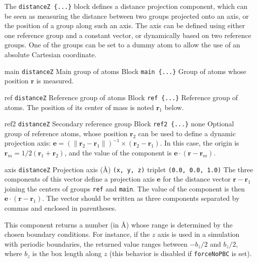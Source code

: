 The \texttt{distanceZ~\{...\}} block defines a distance projection
component, which can be seen as measuring the distance between two
groups projected onto an axis, or the position of a group along such
an axis.  The axis can be defined using either one reference group and
a constant vector, or dynamically based on two reference groups.
One of the groups can be set to a dummy atom to allow the use of an absolute Cartesian coordinate.

\begin{cvcoptions}
\item %
  \key
    {main}{%
    \texttt{distanceZ}}{%
    Main group of atoms}{%
    Block \texttt{main \{...\}}}{%
    Group of atoms whose position $\bm{r}$ is measured.}

\item %
  \key
    {ref}{%
    \texttt{distanceZ}}{%
    Reference group of
    atoms}{%
    Block \texttt{ref \{...\}}}{%
    Reference group of atoms.  The position of its center of mass is
    noted $\bm{r}_1$ below.}

\item %
  \keydef
    {ref2}{%
    \texttt{distanceZ}}{%
    Secondary reference
    group}{%
    Block \texttt{ref2 \{...\}}}{%
    none}{%
    Optional group of reference atoms, whose position $\bm{r}_2$ can
    be used to define a dynamic projection axis: $\bm{e}=(\| \bm{r}_2
    - \bm{r}_1\|)^{-1} \times (\bm{r}_2 - \bm{r}_1)$.  In this case,
    the origin is $\bm{r}_m = 1/2 (\bm{r}_1+\bm{r}_2)$, and the value
    of the component is $\bm{e} \cdot (\bm{r}-\bm{r}_m)$.}

\item %
  \keydef
    {axis}{%
    \texttt{distanceZ}}{%
    Projection axis (\AA{})}{%
    \texttt{(x, y, z)} triplet}{%
    \texttt{(0.0, 0.0, 1.0)}}{%
    The three components of this vector define a
    projection axis $\bm{e}$ for the distance vector $\bm{r} -
    \bm{r}_1$ joining the centers of groups \texttt{ref} and
    \texttt{main}. The value of the component is then $\bm{e} \cdot
    (\bm{r}-\bm{r}_1)$.  The vector should be written as three
    components separated by commas and enclosed in parentheses.}

\item %

\item %
\end{cvcoptions}
This component returns a number (in \AA{}) whose range is determined
by the chosen boundary conditions.  For instance, if the $z$ axis is
used in a simulation with periodic boundaries, the returned value ranges
between $-b_{z}/2$ and $b_{z}/2$, where $b_{z}$ is the box length
along $z$ (this behavior is disabled if \texttt{forceNoPBC} is set).



